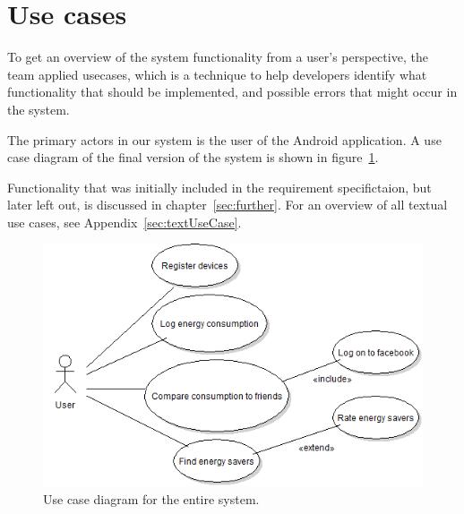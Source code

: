 \section{Use cases}
To get an overview of the system functionality from a user's perspective, the team applied \glspl{usecase}, which is a technique to help developers identify what functionality that should be implemented, and possible errors that might occur in the system.

The primary actors in our system is the user of the Android application. A use case diagram of the final version of the system is shown in figure~\ref{fig:usecase}.

Functionality that was initially included in the requirement specifictaion, but later left out, is discussed in chapter~\ref{sec:further}. 
 For an overview of all textual use cases, see Appendix~\ref{sec:textUseCase}.\\

\begin{figure}[H]
\includegraphics[width=\textwidth]{ch/specification/fig/currentUsecase.png}
\caption{Use case diagram for the entire system.}
\label{fig:usecase}
\end{figure}
